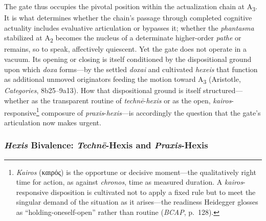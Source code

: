 \documentclass{article}
\newcommand{\gk}[1]{{\greekfont #1}}
\begin{document}
The gate thus occupies the pivotal position within the actualization chain at A\textsubscript{3}. It is what determines whether the chain's passage through completed cognitive actuality includes evaluative articulation or bypasses it; whether the \textit{phantasma} stabilized at A\textsubscript{2} becomes the nucleus of a determinate higher-order \textit{pathe} or remains, so to speak, affectively quiescent. Yet the gate does not operate in a vacuum. Its opening or closing is itself conditioned by the dispositional ground upon which \textit{doxa} forms---by the settled \textit{doxai} and cultivated \textit{hexeis} that function as additional unmoved originators feeding the motion toward A\textsubscript{3} (Aristotle, \textit{Categories}, 8b25--9a13). How that dispositional ground is itself structured---whether as the transparent routine of \textit{technē}-\textit{hexis} or as the open, \textit{kairos}-responsive\footnote{\textit{Kairos} (\gk{καιρός}) is the opportune or decisive moment---the qualitatively right time for action, as against \textit{chronos}, time as measured duration. A \textit{kairos}-responsive disposition is cultivated not to apply a fixed rule but to meet the singular demand of the situation as it arises---the readiness Heidegger glosses as ``holding-oneself-open'' rather than routine (\textit{BCAP}, p.~128).} composure of \textit{praxis}-\textit{hexis}---is accordingly the question that the gate's articulation now makes urgent.


\subsubsection*{\textit{Hexis} Bivalence: \textit{Techn\=e}-Hexis and \textit{Praxis}-Hexis}
\end{document}
